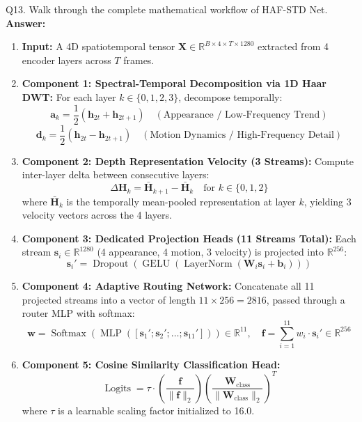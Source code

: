 \documentclass[a4paper, 11pt]{article}
\begin{document}
\begin{questionbox}{Q13. Walk through the complete mathematical workflow of HAF-STD Net.}
\textbf{Answer:}
\begin{enumerate}
    \item \textbf{Input:} A 4D spatiotemporal tensor $\mathbf{X} \in \mathbb{R}^{B \times 4 \times T \times 1280}$ extracted from 4 encoder layers across $T$ frames.
    \item \textbf{Component 1: Spectral-Temporal Decomposition via 1D Haar DWT:}
    For each layer $k \in \{0, 1, 2, 3\}$, decompose temporally:
    \[
    \mathbf{a}_k = \frac{1}{2}(\mathbf{h}_{2t} + \mathbf{h}_{2t+1}) \quad (\text{Appearance / Low-Frequency Trend})
    \]
    \[
    \mathbf{d}_k = \frac{1}{2}(\mathbf{h}_{2t} - \mathbf{h}_{2t+1}) \quad (\text{Motion Dynamics / High-Frequency Detail})
    \]
    \item \textbf{Component 2: Depth Representation Velocity (3 Streams):}
    Compute inter-layer delta between consecutive layers:
    \[
    \Delta \mathbf{H}_k = \bar{\mathbf{H}}_{k+1} - \bar{\mathbf{H}}_k \quad \text{for } k \in \{0, 1, 2\}
    \]
    where $\bar{\mathbf{H}}_k$ is the temporally mean-pooled representation at layer $k$, yielding 3 velocity vectors across the 4 layers.
    \item \textbf{Component 3: Dedicated Projection Heads (11 Streams Total):}
    Each stream $\mathbf{s}_i \in \mathbb{R}^{1280}$ (4 appearance, 4 motion, 3 velocity) is projected into $\mathbb{R}^{256}$:
    \[
    \mathbf{s}_i' = \operatorname{Dropout}(\operatorname{GELU}(\operatorname{LayerNorm}(\mathbf{W}_i \mathbf{s}_i + \mathbf{b}_i)))
    \]
    \item \textbf{Component 4: Adaptive Routing Network:}
    Concatenate all 11 projected streams into a vector of length $11 \times 256 = 2816$, passed through a router MLP with softmax:
    \[
    \mathbf{w} = \operatorname{Softmax}\left(\operatorname{MLP}([\mathbf{s}_1'; \mathbf{s}_2'; \dots; \mathbf{s}_{11}'])\right) \in \mathbb{R}^{11}, \quad \mathbf{f} = \sum_{i=1}^{11} w_i \cdot \mathbf{s}_i' \in \mathbb{R}^{256}
    \]
    \item \textbf{Component 5: Cosine Similarity Classification Head:}
    \[
    \operatorname{Logits} = \tau \cdot \left( \frac{\mathbf{f}}{\|\mathbf{f}\|_2} \right) \left( \frac{\mathbf{W}_{\text{class}}}{\|\mathbf{W}_{\text{class}}\|_2} \right)^T
    \]
    where $\tau$ is a learnable scaling factor initialized to 16.0.
\end{enumerate}
\end{questionbox}
\end{document}
